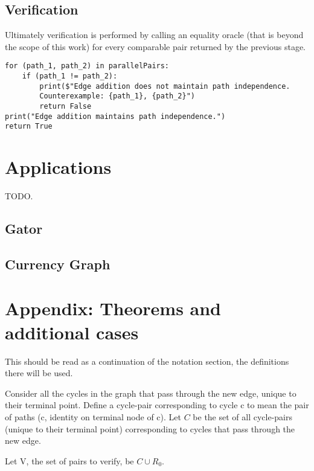 \documentclass{article}
\begin{document}
\subsection{Verification}
Ultimately verification is performed by calling an equality oracle (that is beyond the scope of this work) for every comparable pair returned by the previous stage.

\begin{verbatim}
for (path_1, path_2) in parallelPairs:
    if (path_1 != path_2):
        print($"Edge addition does not maintain path independence. 
        Counterexample: {path_1}, {path_2}")
        return False
print("Edge addition maintains path independence.")
return True
\end{verbatim}

\section{Applications}
TODO.
\subsection{Gator}
\subsection{Currency Graph}

\section{Appendix: Theorems and additional cases}
This should be read as a continuation of the notation section, the definitions there will be used.



Consider all the cycles in the graph that pass through the new edge, unique to their terminal point.
Define a cycle-pair corresponding to cycle c to mean the pair of paths (c, identity on terminal node of c).
Let $C$ be the set of all cycle-pairs (unique to their terminal point) corresponding to cycles that pass through the new edge.

Let V, the set of pairs to verify, be $C \cup R_0$.
\end{document}

